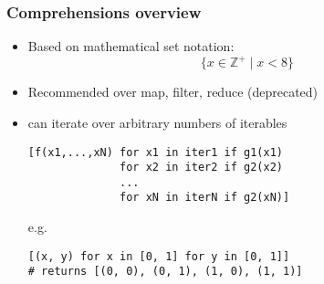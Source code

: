 \documentclass[12pt, xcolor={dvipsnames}]{beamer}
\begin{document}
\begin{frame}[fragile]
  \frametitle{Comprehensions overview}
  \begin{itemize}
    \item Based on mathematical set notation:
      \begin{equation}
  	    \{x \in \mathbb Z^+ \mid x < 8\}
      \end{equation}
    \item Recommended over map, filter, reduce (deprecated)
    \item can iterate over arbitrary numbers of iterables
      \begin{lstlisting}
[f(x1,...,xN) for x1 in iter1 if g1(x1)
              for x2 in iter2 if g2(x2)
              ...
              for xN in iterN if g2(xN)]
      \end{lstlisting}
      e.g.
      \begin{lstlisting}
[(x, y) for x in [0, 1] for y in [0, 1]]
# returns [(0, 0), (0, 1), (1, 0), (1, 1)]
      \end{lstlisting}
  \end{itemize}
\end{frame}
\end{document}
